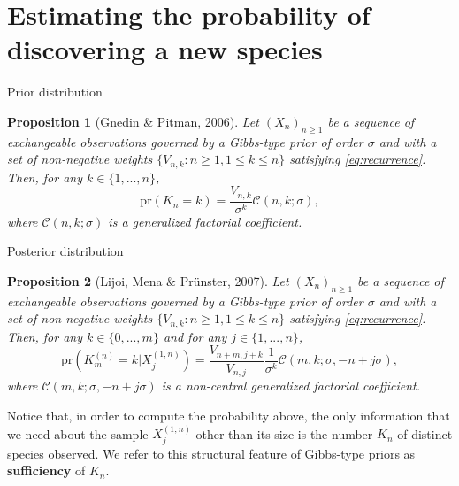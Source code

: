 \documentclass[11pt, handout]{beamer}
\newtheorem{proposition}{Proposition}
\begin{document}
\section{Estimating the probability of discovering a new species}

\begin{frame}{Prior distribution}
    \begin{proposition}[Gnedin \& Pitman, 2006]
         Let \((X_n)_{n \geq 1}\) be a sequence of exchangeable observations governed by a Gibbs-type prior of order \(\sigma\) and with a set of non-negative weights \(\{V_{n, k} \colon n \geq 1, 1 \leq k \leq n\}\) satisfying \eqref{eq:recurrence}. Then, for any \(k \in \{1,...,n\}\),
        \begin{equation*}
            \text{pr}(K_n = k) = \frac{V_{n,k}}{\sigma^k} \mathscr{C}(n, k; \sigma),
        \end{equation*}
        where \(\mathscr{C}(n, k; \sigma)\) is a generalized factorial coefficient. %
    \end{proposition}
\end{frame}

\begin{frame}{Posterior distribution}
    \begin{proposition}[Lijoi, Mena \& Pr{\"u}nster, 2007]
        Let \((X_n)_{n \geq 1}\) be a sequence of exchangeable observations governed by a Gibbs-type prior of order \(\sigma\) and with a set of non-negative weights \(\{V_{n, k} \colon n \geq 1, 1 \leq k \leq n\}\) satisfying \eqref{eq:recurrence}. Then, for any \(k \in \{0,...,m\}\) and for any \(j \in \{1,...,n\}\),
        \begin{equation*}
            \text{pr}(K_m^{(n)} = k | X_j^{(1,n)}) = \frac{V_{n+m,j+k}}{V_{n,j}}\frac{1}{\sigma^k} \mathscr{C}(m, k; \sigma, -n + j \sigma),
        \end{equation*}
        where \(\mathscr{C}(m, k; \sigma, -n + j \sigma)\) is a non-central generalized factorial coefficient.
    \end{proposition}
    \medskip
    Notice that, in order to compute the probability above, the only information that we need about the sample \(X_j^{(1,n)}\) other than its size is the number \(K_n\) of distinct species observed. We refer to this structural feature of Gibbs-type priors as \textbf{sufficiency} of \(K_n\).
\end{frame}
\end{document}
